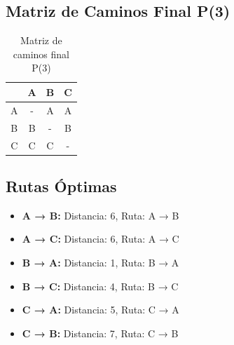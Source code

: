 \documentclass[12pt]{article}
\begin{document}
\clearpage
\subsection{Matriz de Caminos Final P(3)}
\begin{table}[h!]
\centering
\begin{tabular}{|c|c|c|c|}
\hline
 & A & B & C \\\hline
A & - & A & A \\\hline
B & B & - & B \\\hline
C & C & C & - \\\hline
\end{tabular}
\caption{Matriz de caminos final P(3)}
\end{table}

\clearpage
\subsection{Rutas Óptimas}
\begin{itemize}
\item \textbf{A → B:} Distancia: 6, Ruta: A → B
\item \textbf{A → C:} Distancia: 6, Ruta: A → C
\item \textbf{B → A:} Distancia: 1, Ruta: B → A
\item \textbf{B → C:} Distancia: 4, Ruta: B → C
\item \textbf{C → A:} Distancia: 5, Ruta: C → A
\item \textbf{C → B:} Distancia: 7, Ruta: C → B
\end{itemize}
\end{document}
